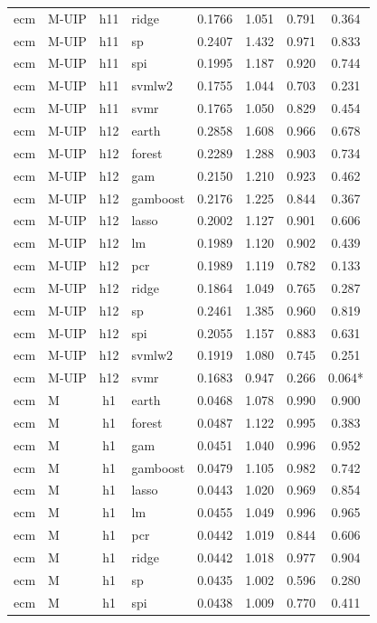 \begin{ThreePartTable}
\begin{longtable}[t]{llclcccc}
ecm & M-UIP & h11 & ridge & 0.1766 & 1.051 & 0.791 & 0.364\\
ecm & M-UIP & h11 & sp & 0.2407 & 1.432 & 0.971 & 0.833\\
ecm & M-UIP & h11 & spi & 0.1995 & 1.187 & 0.920 & 0.744\\
ecm & M-UIP & h11 & svmlw2 & 0.1755 & 1.044 & 0.703 & 0.231\\
ecm & M-UIP & h11 & svmr & 0.1765 & 1.050 & 0.829 & 0.454\\
\addlinespace
ecm & M-UIP & h12 & earth & 0.2858 & 1.608 & 0.966 & 0.678\\
ecm & M-UIP & h12 & forest & 0.2289 & 1.288 & 0.903 & 0.734\\
ecm & M-UIP & h12 & gam & 0.2150 & 1.210 & 0.923 & 0.462\\
ecm & M-UIP & h12 & gamboost & 0.2176 & 1.225 & 0.844 & 0.367\\
ecm & M-UIP & h12 & lasso & 0.2002 & 1.127 & 0.901 & 0.606\\
ecm & M-UIP & h12 & lm & 0.1989 & 1.120 & 0.902 & 0.439\\
ecm & M-UIP & h12 & pcr & 0.1989 & 1.119 & 0.782 & 0.133\\
ecm & M-UIP & h12 & ridge & 0.1864 & 1.049 & 0.765 & 0.287\\
ecm & M-UIP & h12 & sp & 0.2461 & 1.385 & 0.960 & 0.819\\
ecm & M-UIP & h12 & spi & 0.2055 & 1.157 & 0.883 & 0.631\\
ecm & M-UIP & h12 & svmlw2 & 0.1919 & 1.080 & 0.745 & 0.251\\
ecm & M-UIP & h12 & svmr & 0.1683 & 0.947 & 0.266 & 0.064*\\
\addlinespace
ecm & M & h1 & earth & 0.0468 & 1.078 & 0.990 & 0.900\\
ecm & M & h1 & forest & 0.0487 & 1.122 & 0.995 & 0.383\\
ecm & M & h1 & gam & 0.0451 & 1.040 & 0.996 & 0.952\\
ecm & M & h1 & gamboost & 0.0479 & 1.105 & 0.982 & 0.742\\
ecm & M & h1 & lasso & 0.0443 & 1.020 & 0.969 & 0.854\\
ecm & M & h1 & lm & 0.0455 & 1.049 & 0.996 & 0.965\\
ecm & M & h1 & pcr & 0.0442 & 1.019 & 0.844 & 0.606\\
ecm & M & h1 & ridge & 0.0442 & 1.018 & 0.977 & 0.904\\
ecm & M & h1 & sp & 0.0435 & 1.002 & 0.596 & 0.280\\
ecm & M & h1 & spi & 0.0438 & 1.009 & 0.770 & 0.411\\

\end{longtable}
\end{ThreePartTable}

